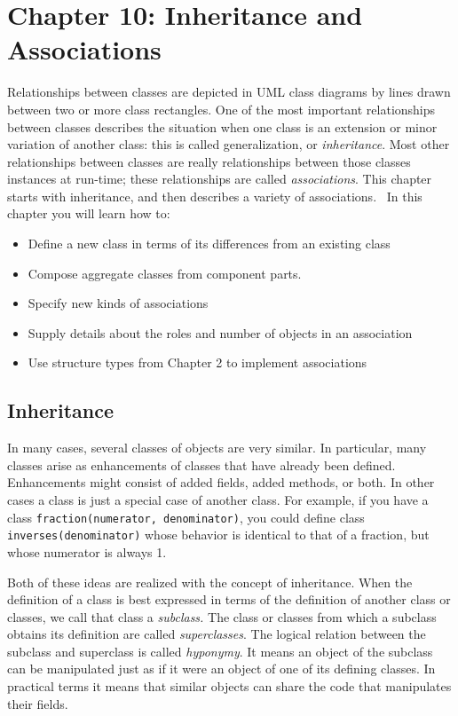 \clearpage\section{Chapter 10: Inheritance and Associations}

Relationships between classes are depicted in UML class diagrams by
lines drawn between two or more class rectangles. One of the most
important relationships between classes describes the situation when
one class is an extension or minor variation of another class: this is
called generalization, or \textit{inheritance}. Most other
relationships between classes are really relationships between those
classes{\textquotesingle} instances at run-time; these
relationships are called \textit{associations}. This chapter starts
with inheritance, and then describes a variety of associations. \ In
this chapter you will learn how to:

\begin{itemize}\itemsep0pt
\item Define a new class in terms of its differences from an existing
class
\item Compose aggregate classes from component parts.
\item Specify new kinds of associations
\item Supply details about the roles and number of objects in an
association
\item Use structure types from Chapter 2 to implement associations
\end{itemize}

\subsection{Inheritance}

In many cases, several classes of objects are very similar. In
particular, many classes arise as enhancements of classes that have
already been defined. Enhancements might consist of added fields, added
methods, or both. In other cases a class is just a special case of
another class. For example, if you have a class
\texttt{fraction(numerator, denominator)}, you could define class
\texttt{inverses(denominator)} whose behavior is identical to that of a
fraction, but whose numerator is always 1. 

Both of these ideas are realized with the concept of
inheritance. When the definition of a class is best
expressed in terms of the definition of another class or classes, we
call that class a \textit{subclass.} The class or
classes from which a subclass obtains its definition are called
\textit{superclass}\textit{es}. The logical relation
between the subclass and superclass is called \textit{hyponymy}. It
means an object of the subclass can be manipulated just as if it were
an object of one of its defining classes. In practical terms it means
that similar objects can share the code that manipulates their fields.

